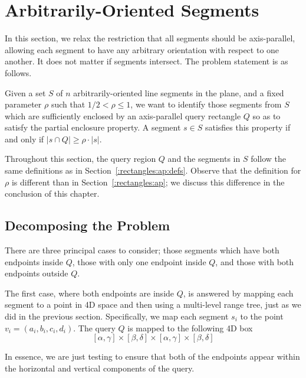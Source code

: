 \section{Arbitrarily-Oriented Segments}
\label{:rectangles:ao}

In this section, we relax the restriction that all segments should be axis-parallel, allowing each segment to have any arbitrary orientation with respect to one another. 
It does not matter if segments intersect. 
The problem statement is as follows.

\begin{problem}
Given a set $S$ of $n$ arbitrarily-oriented line segments in the plane, and a fixed parameter $\rho$ such that $1/2 < \rho \leq 1$, we want to identify those segments from $S$ which are sufficiently enclosed by an axis-parallel query rectangle $Q$ so as to satisfy the partial enclosure property. 
A segment $s \in S$ satisfies this property if and only if $|s \cap Q| \geq \rho \cdot |s|$.
\end{problem}

Throughout this section, the query region $Q$ and the segments in $S$ follow the same definitions as in Section~\ref{:rectangles:ap:defs}. 
Observe that the definition for $\rho$ is different than in Section~\ref{:rectangles:ap}; we discuss this difference in the conclusion of this chapter.


\subsection{Decomposing the Problem}
\label{:rectangles:ao:approach}

There are three principal cases to consider; those segments which have both endpoints inside $Q$, those with only one endpoint inside $Q$, and those with both endpoints outside $Q$.  

The first case, where both endpoints are inside $Q$, is answered by mapping each segment to a point in 4D space and then using a multi-level range tree, just as we did in the previous section.  Specifically, we map each segment $s_i$ to the point $v_i = (a_i, b_i, c_i, d_i)$. The query $Q$ is mapped to the following 4D box
\[
[\alpha, \gamma] \times [\beta, \delta] \times [\alpha, \gamma] \times [\beta, \delta]
\]

In essence, we are just testing to ensure that both of the endpoints appear within the horizontal and vertical components of the query.

